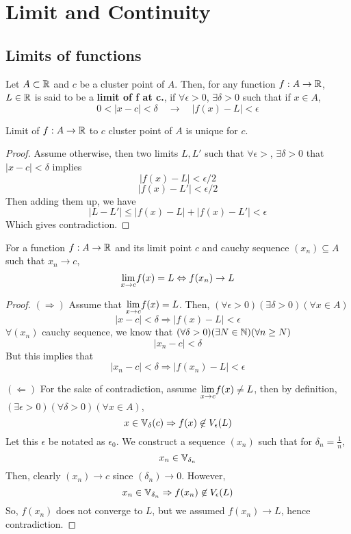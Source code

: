 \chapter{Limit and Continuity}
\section{Limits of functions}
\begin{definition} Let $A \subset {\mathbb{R}}$ and $c$ be a cluster point of $A$. Then, for any function $f: A \to {\mathbb{R}}$, $L \in {\mathbb{R}}$ is said to be a \textbf{limit of f at c.}, if $\forall \epsilon > 0$, $\exists \delta > 0$ such that if $x \in A$,
    \[ 0 < |x-c| < \delta \quad \rightarrow \quad |f(x)- L| < \epsilon \]
\end{definition}

\begin{theorem} Limit of $f: A \to {\mathbb{R}}$ to $c$ cluster point of $A$ is unique for $c$.
    \begin{proof}
        Assume otherwise, then two limits $L, L'$ such that $\forall \epsilon >$, $\exists \delta > 0$ that $|x-c| < \delta$ implies
        \[ |f(x) - L| < \epsilon/2\]
        \[ |f(x) - L'| < \epsilon /2\]
        Then adding them up, we have
        \[ | L - L'| \le |f(x) -L| + |f(x) - L'| < \epsilon\]
        Which gives contradiction.
    \end{proof}
\end{theorem}
\begin{theorem}
    For a function $f: A \to {\mathbb{R}}$ and its limit point $c$ and cauchy sequence $(x_n) \subseteq A$ such that $x_n \to c$,
    \[ \underset{x \to c}{\lim} f(x) = L \Leftrightarrow f(x_n) \to L\]
    \begin{proof}
        $(\Rightarrow)$ Assume that $\underset{x \to c}{\lim} f(x) = L$. Then, $(\forall \epsilon > 0)(\exists \delta > 0)(\forall x \in A) $
        \[ |x-c|< \delta \Rightarrow |f(x) -L| < \epsilon\]
        $\forall (x_n)$ cauchy sequence, we know that $(\forall \delta > 0)(\exists N \in {\mathbb{N}})(\forall n \ge N)$
        \[ |x_n - c| < \delta\]
        But this implies that
        \[ |x_n - c| < \delta \Rightarrow |f(x_n) - L| < \epsilon\]

        $(\Leftarrow)$ For the sake of contradiction, assume $\underset{x \to c}{\lim} f(x) \neq L$, then by definition, $(\exists \epsilon >0 )(\forall \delta > 0)(\forall x \in A)$,
        \[ x \in {\mathbb{V}}_{\delta}(c) \Rightarrow f(x) \not\in V_{\epsilon}(L)\]
        Let this $\epsilon$ be notated as $\epsilon_0$. We construct a sequence $(x_n)$ such that for $\delta_n = \frac{1}{n}$,
        \[ x_n \in {\mathbb{V}}_{\delta_n}\]
        Then, clearly $(x_n) \rightarrow c$ since $(\delta_n) \rightarrow 0$. However,
        \[  x_n \in {\mathbb{V}}_{\delta_n} \Rightarrow f(x_n) \not\in V_{\epsilon}(L)\]
        So, $f(x_n)$ does not converge to $L$, but we assumed $f(x_n) \rightarrow L$, hence contradiction.
    \end{proof}
\end{theorem}
